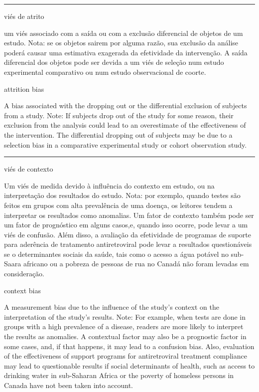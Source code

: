 \documentclass[
]{book}
\begin{document}
\begin{center}\rule{0.5\linewidth}{0.5pt}\end{center}

viés de atrito

um viés associado com a saída ou com a exclusão diferencial de objetos de um estudo. Nota: se os objetos sairem por alguma razão, sua exclusão da análise poderá causar uma estimativa exagerada da efetividade da intervenção. A saída diferencial dos objetos pode ser devida a um viés de seleção num estudo experimental comparativo ou num estudo observacional de coorte.

attrition bias

A bias associated with the dropping out or the differential exclusion of subjects from a study. Note: If subjects drop out of the study for some reason, their exclusion from the analysis could lead to an overestimate of the effectiveness of the intervention. The differential dropping out of subjects may be due to a selection bias in a comparative experimental study or cohort observation study.

\begin{center}\rule{0.5\linewidth}{0.5pt}\end{center}

viés de contexto

Um viés de medida devido à influência do contexto em estudo, ou na interpretação dos resultados do estudo. Nota: por exemplo, quando testes são feitos em grupos com alta prevalência de uma doença, os leitores tendem a interpretar os resultados como anomalias. Um fator de contexto também pode ser um fator de prognóstico em alguns casos,e, quando isso ocorre, pode levar a um viés de confusão. Além disso, a avaliação da efetividade de programas de suporte para aderência de tratamento antiretroviral pode levar a resultados questionáveis se o determinantes sociais da saúde, tais como o acesso a água potável no sub-Saara africano ou a pobreza de pessoas de rua no Canadá não foram levadas em consideração.

context bias

A measurement bias due to the influence of the study's context on the interpretation of the study's results. Note: For example, when tests are done in groups with a high prevalence of a disease, readers are more likely to interpret the results as anomalies. A contextual factor may also be a prognostic factor in some cases, and, if that happens, it may lead to a confusion bias. Also, evaluation of the effectiveness of support programs for antiretroviral treatment compliance may lead to questionable results if social determinants of health, such as access to drinking water in sub-Saharan Africa or the poverty of homeless persons in Canada have not been taken into account.
\end{document}
